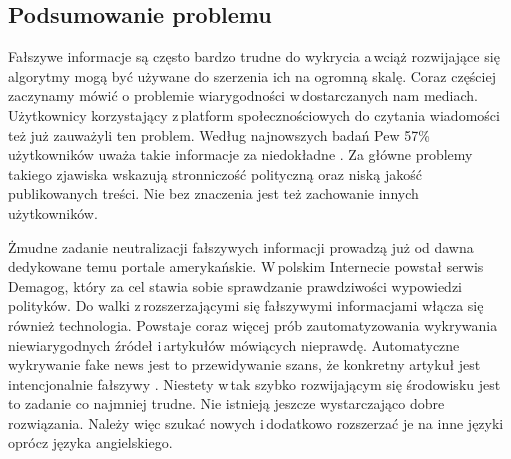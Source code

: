 \subsection{Podsumowanie problemu}
Fałszywe informacje są często bardzo trudne do wykrycia a\,wciąż rozwijające się algorytmy mogą być używane do szerzenia ich na ogromną skalę. Coraz częściej zaczynamy mówić o problemie wiarygodności w\,dostarczanych nam mediach. Użytkownicy korzystający z\,platform społecznościowych do czytania wiadomości też już zauważyli ten problem. Według najnowszych badań Pew 57\% użytkowników uważa takie informacje za niedokładne \cite{PewNewsUse2018}. Za główne problemy takiego zjawiska wskazują stronniczość polityczną oraz niską jakość publikowanych treści. Nie bez znaczenia jest też zachowanie innych użytkowników. 
\par Żmudne zadanie neutralizacji fałszywych informacji prowadzą już od dawna dedykowane temu portale amerykańskie. W\,polskim Internecie powstał serwis Demagog, który za cel stawia sobie sprawdzanie prawdziwości wypowiedzi polityków. Do walki z\,rozszerzającymi się fałszywymi informacjami włącza się również technologia. Powstaje coraz więcej prób zautomatyzowania wykrywania niewiarygodnych źródeł i\,artykułów mówiących nieprawdę. Automatyczne wykrywanie fake news jest to przewidywanie szans, że konkretny artykuł jest intencjonalnie fałszywy \cite{threeTypeOfFakes2015}. Niestety w\,tak szybko rozwijającym się środowisku jest to zadanie co najmniej trudne. Nie istnieją jeszcze wystarczająco dobre rozwiązania. Należy więc szukać nowych i\,dodatkowo rozszerzać je na inne języki oprócz języka angielskiego. 
